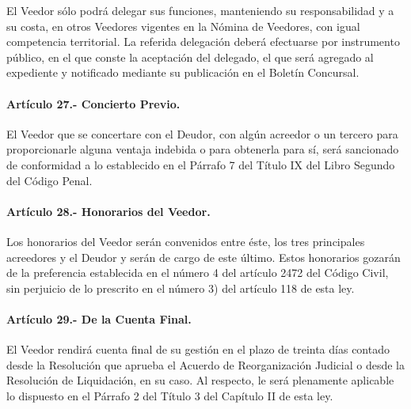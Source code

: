 \documentclass[
]{book}
\begin{document}
El Veedor sólo podrá delegar sus funciones, manteniendo su responsabilidad y a su costa, en otros Veedores vigentes en la Nómina de Veedores, con igual competencia territorial.
La referida delegación deberá efectuarse por instrumento público, en el que conste la aceptación del delegado, el que será agregado al expediente y notificado mediante su publicación en el Boletín Concursal.

\hypertarget{artuxedculo-27.--concierto-previo.}{%
\paragraph*{Artículo 27.- Concierto Previo.}\label{artuxedculo-27.--concierto-previo.}}

El Veedor que se concertare con el Deudor, con algún acreedor o un tercero para proporcionarle alguna ventaja indebida o para obtenerla para sí, será sancionado de conformidad a lo establecido en el Párrafo 7 del Título IX del Libro Segundo del Código Penal.

\hypertarget{artuxedculo-28.--honorarios-del-veedor.}{%
\paragraph*{Artículo 28.- Honorarios del Veedor.}\label{artuxedculo-28.--honorarios-del-veedor.}}

Los honorarios del Veedor serán convenidos entre éste, los tres principales acreedores y el Deudor y serán de cargo de este último. Estos honorarios gozarán de la preferencia establecida en el número 4 del artículo 2472 del Código Civil, sin perjuicio de lo prescrito en el número 3) del artículo 118 de esta ley.

\hypertarget{artuxedculo-29.--de-la-cuenta-final.}{%
\paragraph*{Artículo 29.- De la Cuenta Final.}\label{artuxedculo-29.--de-la-cuenta-final.}}

El Veedor rendirá cuenta final de su gestión en el plazo de treinta días contado desde la Resolución que aprueba el Acuerdo de Reorganización Judicial o desde la Resolución de Liquidación, en su caso. Al respecto, le será plenamente aplicable lo dispuesto en el Párrafo 2 del Título 3 del Capítulo II de esta ley.
\end{document}
